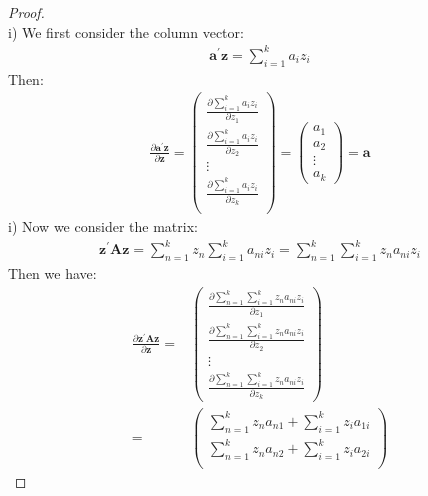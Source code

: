 \documentclass{article}
\begin{document}
	\begin{proof}
		\mbox{}\\
		i) We first consider the column vector:
			\begin{align*}
				\boldsymbol{a}^\prime \boldsymbol{z} = \sum\limits^k_{i=1}a_i z_i
			\end{align*}
		Then:
			\begin{align*}
				\frac{\partial \boldsymbol{a}^\prime \boldsymbol{z}}{\partial \boldsymbol{z}} =
				\begin{pmatrix}
					\frac{\partial \sum\limits^k_{i=1}a_i z_i}{\partial z_1}\\
					\frac{\partial \sum\limits^k_{i=1}a_i z_i}{\partial z_2}\\
					\vdots\\
					\frac{\partial \sum\limits^k_{i=1}a_i z_i}{\partial z_k}\\
				\end{pmatrix} = 
				\begin{pmatrix}
					a_1\\
					a_2\\
					\vdots\\
					a_k
				\end{pmatrix} = \boldsymbol{a}
			\end{align*}
		i) Now we consider the matrix:
			\begin{align*}
				\boldsymbol{z}^\prime \boldsymbol{A} \boldsymbol{z} = \sum\limits^k_{n=1} z_n \sum\limits^k_{i=1} a_{ni}z_i = \sum\limits^k_{n=1} \sum\limits^k_{i=1} z_n a_{ni} z_i
			\end{align*}
		Then we have:
			\begin{align*}
				\frac{\partial \boldsymbol{z}^\prime \boldsymbol{A} \boldsymbol{z}}{\partial \boldsymbol{z}} = &
				\begin{pmatrix}
					\frac{\partial \sum\limits^k_{n=1} \sum\limits^k_{i=1} z_n a_{ni} z_i}{\partial z_1}\\
					\frac{\partial \sum\limits^k_{n=1} \sum\limits^k_{i=1} z_n a_{ni} z_i}{\partial z_2}\\
					\vdots\\
					\frac{\partial \sum\limits^k_{n=1} \sum\limits^k_{i=1} z_n a_{ni} z_i}{\partial z_k}
				\end{pmatrix}\\ = &
				\begin{pmatrix}
					\sum\limits^k_{n=1} z_n a_{n1} + \sum\limits^k_{i=1} z_i a_{1i}\\
					\sum\limits^k_{n=1} z_n a_{n2} + \sum\limits^k_{i=1} z_i a_{2i}\\

\end{pmatrix}
\end{align*}
\end{proof}
\end{document}
